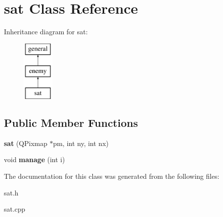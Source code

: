 \hypertarget{classsat}{\section{sat \-Class \-Reference}
\label{classsat}
}
\-Inheritance diagram for sat\-:\begin{figure}[H]
\begin{center}
\leavevmode
\includegraphics[height=3.000000cm]{classsat}
\end{center}
\end{figure}
\subsection*{\-Public \-Member \-Functions}
\begin{DoxyCompactItemize}
\item 
\hypertarget{classsat_ac193847a474a68ced814482bdb0f19ef}{{\bfseries sat} (\-Q\-Pixmap $\ast$pm, int ny, int nx)}\label{classsat_ac193847a474a68ced814482bdb0f19ef}

\item 
\hypertarget{classsat_a84bff237be60cae54ca2ad4bdb11001e}{void {\bfseries manage} (int i)}\label{classsat_a84bff237be60cae54ca2ad4bdb11001e}

\end{DoxyCompactItemize}


\-The documentation for this class was generated from the following files\-:\begin{DoxyCompactItemize}
\item 
sat.\-h\item 
sat.\-cpp\end{DoxyCompactItemize}
